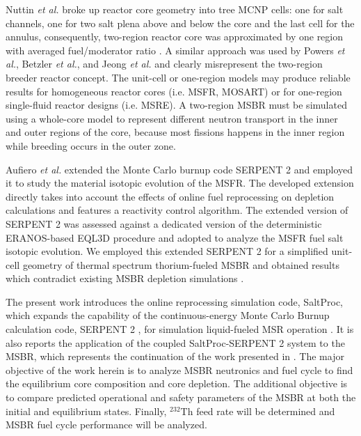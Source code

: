 Nuttin \emph{et al.} broke up reactor core geometry into tree \gls{MCNP} cells: 
one for salt channels, one for two salt plena above and below the core and the 
last cell for the annulus, consequently, two-region reactor core was 
approximated by one region with averaged fuel/moderator ratio 
\cite{nuttin_potential_2005}.  A similar approach was used by Powers \emph{et 
al.}, Betzler \emph{et al.}, and Jeong \emph{et al.} 
\cite{powers_new_2013,powers_inventory_2014,betzler_modeling_2016, 
betzler_molten_2017, jeong_development_2014, jeong_equilibrium_2016} and clearly 
misrepresent the two-region breeder reactor concept. The unit-cell or one-region 
models may produce reliable results for homogeneous reactor cores (i.e. 
\gls{MSFR}, \gls{MOSART}) or for one-region single-fluid reactor designs (i.e. 
\gls{MSRE}). A two-region \gls{MSBR} must be simulated using a whole-core model 
to represent different neutron transport in the inner and outer regions of the 
core, because most fissions happens in the inner region while breeding occurs in 
the outer zone.  

Aufiero \emph{et al.} extended the Monte Carlo burnup code SERPENT 2 and 
employed it to study the material isotopic evolution of the \gls{MSFR}. The 
developed extension directly takes into account the effects of online fuel 
reprocessing on depletion calculations and features a reactivity control 
algorithm. The extended version of SERPENT 2 was assessed against a dedicated 
version of the deterministic ERANOS-based EQL3D procedure 
\cite{ruggieri_eranos_2006} and adopted to analyze the \gls{MSFR} fuel salt 
isotopic evolution. We employed this extended SERPENT 2 for a simplified 
unit-cell geometry of thermal spectrum thorium-fueled \gls{MSBR} and obtained 
results which contradict existing \gls{MSBR} depletion simulations 
\cite{jeong_equilibrium_2016}.

The present work introduces the online reprocessing simulation code, SaltProc, 
which expands the capability of the continuous-energy Monte Carlo Burnup 
calculation code, SERPENT 2 \cite{leppanen_serpent_2015-1}, for simulation 
liquid-fueled \gls{MSR} operation \cite{andrei_rykhlevskii_arfc/saltproc:_2018}. 
It is also reports the application of the coupled SaltProc-SERPENT 2 system to 
the \gls{MSBR}, which represents the continuation of the work presented in 
\cite{rykhlevskii_full-core_2017, rykhlevskii_online_2017}. The major objective 
of the work herein is to analyze \gls{MSBR} neutronics and fuel cycle to find 
the equilibrium core composition and core depletion. The additional objective is 
to compare predicted operational and safety parameters of the \gls{MSBR} at both 
the initial and equilibrium states. Finally, $^{232}$Th feed rate will be 
determined and \gls{MSBR} fuel cycle performance will be analyzed.


